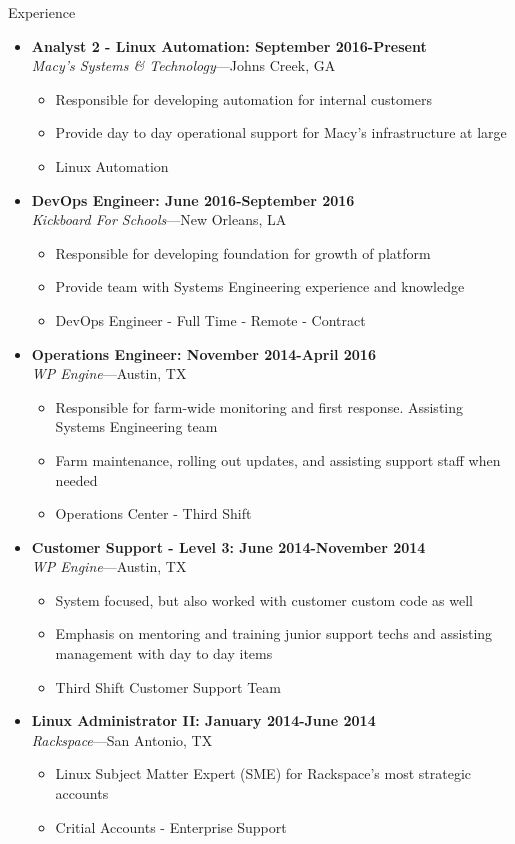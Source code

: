 \documentclass[10pt,oneside]{article}
\newenvironment{ressection}[1]{
    \vspace{4pt}
    {\fontfamily{phv}\selectfont\Large#1}
    \begin{itemize}
    \vspace{3pt}
}{
    \end{itemize}
}
\newcommand{\resitem}[1]{
    \vspace{-4pt}
    \item \begin{flushleft} #1 \end{flushleft}
}
\newcommand{\ressubitem}[1]{
    \vspace{-1pt}
    \item \begin{flushleft} #1 \end{flushleft}
}
\newcommand{\resbigitem}[3]{
    \vspace{-5pt}
    \item
    \textbf{#3} \\
    \textit{#1}---#2
}
\newenvironment{ressubsec}[3]{
    \resbigitem{#1}{#2}{#3}
    \vspace{-2pt}
    \begin{itemize}
}{
    \end{itemize}
}
\newenvironment{reslist}[1]{
    \resitem{\textbf{#1}}
    \vspace{-5pt}
    \begin{itemize}
}{
    \end{itemize}
}
\begin{document}
\begin{ressection}{Experience}

    \begin{ressubsec}{Macy's Systems \& Technology}{Johns Creek, GA}{Analyst 2 - Linux Automation: September 2016-Present}
        \ressubitem{Responsible for developing automation for internal customers}
        \ressubitem{Provide day to day operational support for Macy's infrastructure at large}
        \ressubitem{Linux Automation}
    \end{ressubsec}

    \begin{ressubsec}{Kickboard For Schools}{New Orleans, LA}{DevOps Engineer: June 2016-September 2016}
        \ressubitem{Responsible for developing foundation for growth of platform}
        \ressubitem{Provide team with Systems Engineering experience and knowledge}
        \ressubitem{DevOps Engineer - Full Time - Remote - Contract}
    \end{ressubsec}

    \begin{ressubsec}{WP Engine}{Austin, TX}{Operations Engineer: November 2014-April 2016}
        \ressubitem{Responsible for farm-wide monitoring and first response.  Assisting Systems Engineering team}
        \ressubitem{Farm maintenance, rolling out updates, and assisting support staff when needed}
        \ressubitem{Operations Center - Third Shift}
    \end{ressubsec}

    \begin{ressubsec}{WP Engine}{Austin, TX}{Customer Support - Level 3: June 2014-November 2014}
        \ressubitem{System focused, but also worked with customer custom code as well}
        \ressubitem{Emphasis on mentoring and training junior support techs and assisting management with day to day items}
        \ressubitem{Third Shift Customer Support Team}
    \end{ressubsec}

    \begin{ressubsec}{Rackspace}{San Antonio, TX}{Linux Administrator II: January 2014-June 2014}
        \ressubitem{Linux Subject Matter Expert (SME) for Rackspace's most strategic accounts}
        \ressubitem{Critial Accounts - Enterprise Support}
    \end{ressubsec}


\end{ressection}
\end{document}
